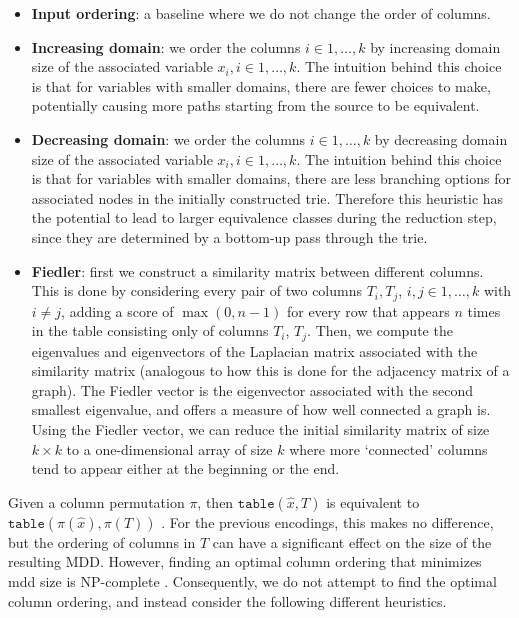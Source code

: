 {{\begin{itemize}
    \item \textbf{Input ordering}: a baseline where we do not change the order of columns.
    \item \textbf{Increasing domain}: we order the columns $i \in 1, \dots, k$ by increasing domain size of the associated variable $x_i, i \in 1, \dots, k$. The intuition behind this choice is that for variables with smaller domains, there are fewer choices to make, potentially causing more paths starting from the source to be equivalent. 
    \item \textbf{Decreasing domain}: we order the columns $i \in 1, \dots, k$ by decreasing domain size of the associated variable $x_i, i \in 1, \dots, k$. The intuition behind this choice is that for variables with smaller domains, there are less branching options for associated nodes in the initially constructed trie. Therefore this heuristic has the potential to lead to larger equivalence classes during the reduction step, since they are determined by a bottom-up pass through the trie. 
    \item \textbf{Fiedler}: first we construct a similarity matrix between different columns. This is done by considering every pair of two columns $T_i, T_j$, $i, j \in 1, \dots, k$ with $i \neq j$, adding a score of $\max(0, n-1)$ for every row that appears $n$ times in the table consisting only of columns $T_i$, $T_j$. Then, we compute the eigenvalues and eigenvectors of the Laplacian matrix associated with the similarity matrix (analogous to how this is done for the adjacency matrix of a graph). The Fiedler vector is the eigenvector associated with the second smallest eigenvalue, and offers a measure of how well connected a graph is. Using the Fiedler vector, we can reduce the initial similarity matrix of size $k \times k$ to a one-dimensional array of size $k$ where more `connected' columns tend to appear either at the beginning or the end. 
\end{itemize}
}
Given a column permutation $\pi$, then $\texttt{table}(\hat{x},T)$ is equivalent to $\texttt{table}(\pi(\hat{x}),\pi(T))$ .
For the previous encodings, this makes no difference, but the ordering of columns in $T$ can have a significant effect on the size of the resulting MDD. However, finding an optimal column ordering that minimizes \gls{mdd} size is NP-complete \cite{DBLP:journals/tc/BolligW96}. 
Consequently, we do not attempt to find the optimal column ordering, and instead consider the following different heuristics.
}
